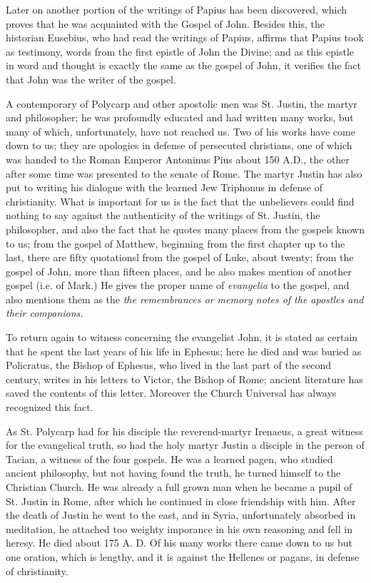 Later on another portion of the writings of Papius has been discovered, which proves that he was acquainted with the Gospel of John. Besides this, the historian Eusebius, who had read  the writings of Papius, affirms that Papius took as testimony, words from the first epistle of John the Divine; and as this epistle in word and thought is exactly the same as the gospel of John, it verifies the fact that John was the writer of the gospel.

A contemporary of Polycarp and other apostolic men was St. Justin, the martyr and philosopher; he was profoundly educated and had written many works, but many of which, unfortunately, have not reached us. Two of his works have come down to us; they are apologies in defense of persecuted christians, one of which was handed to the Roman Emperor Antoninus Pius about 150 A.D., the other after some time was presented to the senate of Rome. The martyr Justin has also put to writing his dialogue with the learned Jew Triphonus in defense of christianity. What is important for us is the fact that the unbelievers could find nothing to say against the authenticity of the writings of St. Justin, the philosopher, and also the fact that he quotes many places from the gospels known to us; from the gospel of Matthew, beginning from the first chapter up to the last, there are fifty quotationsl from the gospel of Luke, about twenty; from the gospel of John, more than fifteen places, and he also makes mention of another gospel (i.e. of Mark.) He gives the proper name of \textit{evangelia} to the gospel, and also mentions them as the \textit{the remembrances or memory notes of the apostles and their companions.}

To return again to witness concerning the evangelist John, it is stated as certain that he spent the last years of his life in Ephesus; here he died and was buried as Policratus, the Bishop of Ephesus, who lived in the last part of the second century, writes in his letters to Victor, the Bishop of Rome; ancient literature has saved the contents of this letter. Moreover the Church Universal has always recognized this fact.

As St. Polycarp had for his disciple the reverend-martyr Irenaeus, a great witness for the evangelical truth, so had the holy martyr Justin a disciple in the person of Tacian, a witness of the four gospels. He was a learned pagen, who studied ancient philosophy, but not having found the truth, he turned himself to the Christian Church. He was already a full grown man when he became a pupil of St. Justin in Rome, after which he continued in close friendship with him. After the death of Justin he went to the east, and in Syria, unfortunately absorbed in meditation, he attached too weighty imporance in his own reasoning and fell in heresy. He died about 175 A. D. Of his many works there came down to us but one oration, which is lengthy, and it is against the Hellenes or pagans, in defense of christianity.


